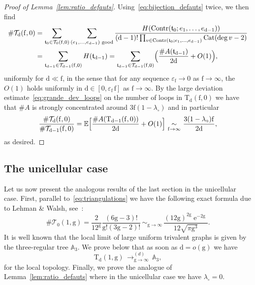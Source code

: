 \documentclass[10pt]{amsart}
\DeclareMathOperator{\Cat}{Cat}
\theoremstyle{plain}
\theoremstyle{definition}
\theoremstyle{remark}
\newcommand{\E}{\mathbb{E}}
\newcommand{\e}{\operatorname{e}}
\newcommand{\Triv}{\mathrm{T}}
\newcommand{\face}{\mathrm{f}}
\newcommand{\defect}{\mathrm{d}}
\newcommand{\gen}{\mathrm{g}}
\newcommand{\cvloi}[1][n]{\,\mathop{\longrightarrow}^{(d)}_{#1 \to \infty}\,}
\newcommand{\equi}[1][n]{\,\mathop{\sim}^{}_{#1 \to \infty}\,}
\begin{document}
\begin{proof}[Proof of Lemma~\ref{lem:ratio_defauts}]
Using~\eqref{eq:bijection_defauts} twice, we then find
\begin{align*}
\# \mathcal{T}_\defect(\face, 0)
&= \sum_{\mathfrak{t}_0 \in \mathcal{T}_0(\face, 0)} \sum_{(e_1, \dots, e_{\defect-1}) \text{ good}} \frac{H(\mathrm{Contr}(\mathfrak{t}_0 ; e_1, \dots, e_{ \defect-1}))}{(\defect-1)! \prod_{v \in \mathrm{Contr}(\mathfrak{t}_0 ; e_1, \dots, e_{\defect-1})} \Cat(\deg v - 2)}
\\
&= \sum_{ \mathfrak{t}_{ \defect-1} \in \mathcal{T}_{ \defect-1}(\face,0) } H(\mathfrak{t}_{\defect-1})
= \sum_{ \mathfrak{t}_{ \defect-1} \in \mathcal{T}_{ \defect-1}(\face,0)} \Bigl(\frac{\# A(\mathfrak{t}_{ \defect-1})}{2 \defect} + O(1)\Bigr),
\end{align*}
uniformly for $\defect \ll \face$, in the sense that for any sequence $\varepsilon_\face \to 0$ as $\face \to \infty$, the $O(1)$ holds uniformly in $\defect \in [0, \varepsilon_\face\, \face]$ as $\face \to \infty$.
By the large deviation estimate~\eqref{eq:grande_dev_loops} on the number of loops in $\mathrm{T}_{ \defect}(\face,0)$ we have that $\#A$ is strongly concentrated around $3\face (1-\lambda_{\circ})$ and in particular
\[
\frac{\# \mathcal{T}_\defect(\face, 0)}{\# \mathcal{T}_{\defect-1}(\face, 0)}
= \E\Bigl[\frac{\# A(\Triv_{ \defect-1}(\face,0))}{2 \defect} + O(1)\Bigr]
\equi[\face] \frac{ 3(1-\lambda_\circ) \face}{2 \defect},
\]
as desired.
\end{proof}

\subsection{The unicellular case}
\label{ssec:unicellularestimates}

Let us now present the analogous results of the last section in the unicellular case. First, parallel to~\eqref{eq:triangulations} we have the following exact formula due to Lehman \& Walsh, see~\cite[Eq.\,(9)]{WL72}:
\begin{equation}\label{eq:triangulations_high_gen}
\#\mathcal{T}_{0}(1,\gen) = \frac{2}{12^{\gen}} \frac{(6\gen-3)!}{\gen!(3\gen-2)!}
\equi[\gen] \frac{(12 \gen)^{2\gen} \e^{-2\gen}}{12 \sqrt{\pi \gen^3}}.
\end{equation}
It is well known that the local limit of large uniform trivalent graphs is given by the three-regular tree $\mathbb{A}_3$.
We prove below that as soon as $ \defect =o(\gen)$ we have
\begin{equation} \label{eq:convthree-regular}
\Triv_{ \defect}(1, \gen) \cvloi[\gen] \mathbb{A}_3,
\end{equation}
for the local topology. Finally, we prove the analogue of Lemma~\ref{lem:ratio_defauts} where in the unicellular case we have $\lambda_{\circ} =0$.
\end{document}
